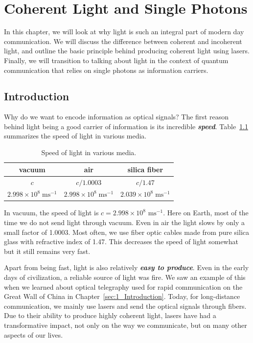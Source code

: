 \chapter{Coherent Light and Single Photons}
\label{sec:5_coherent_light_single_photons}

In this chapter, we will look at why light is such an integral part of modern day communication.
We will discuss the difference between coherent and incoherent light, and outline the basic principle behind producing coherent light using lasers.
Finally, we will transition to talking about light in the context of quantum communication that relies on single photons as information carriers.

\section{Introduction}
\label{sec:5-1_intoduction}

Why do we want to encode information as optical signals?
The first reason behind light being a good carrier of information is its incredible \textit{\textbf{speed}}.
Table~\ref{tab:5-1_speed_light} summarizes the speed of light in various media.
\begin{table}[b!]
    \setcellgapes{5pt}
    \renewcommand\theadfont{}
    \makegapedcells
    \centering
    \begin{tabular}{ccc}
        \hline
        \textbf{vacuum} & \textbf{air} & \textbf{silica fiber} \\
        \hline
        $c$ & $c/1.0003$ & $c/1.47$ \\
        $2.998\times10^{8} \; \text{ms}^{-1}$ & $2.998\times10^{8} \; \text{ms}^{-1}$ & $2.039\times10^{8} \; \text{ms}^{-1}$ \\
        \hline
    \end{tabular}
    \caption[Speed of light.]{Speed of light in various media.}
    \label{tab:5-1_speed_light}
\end{table}
In vacuum, the speed of light is $c=2.998\times 10^8$ $\text{ms}^{-1}$.
Here on Earth, most of the time we do not send light through vacuum.
Even in air the light slows by only a small factor of 1.0003.
Most often, we use fiber optic cables made from pure silica glass with refractive index of 1.47.
This decreases the speed of light somewhat but it still remains very fast.

Apart from being fast, light is also relatively \textit{\textbf{easy to produce}}.
Even in the early days of civilization, a reliable source of light was fire.
We saw an example of this when we learned about optical telegraphy used for rapid communication on the Great Wall of China in Chapter~\ref{sec:1_Introduction}.
Today, for long-distance communication, we mainly use lasers and send the optical signals through fibers.
Due to their ability to produce highly coherent light, lasers have had a transformative impact, not only on the way we communicate, but on many other aspects of our lives. 

